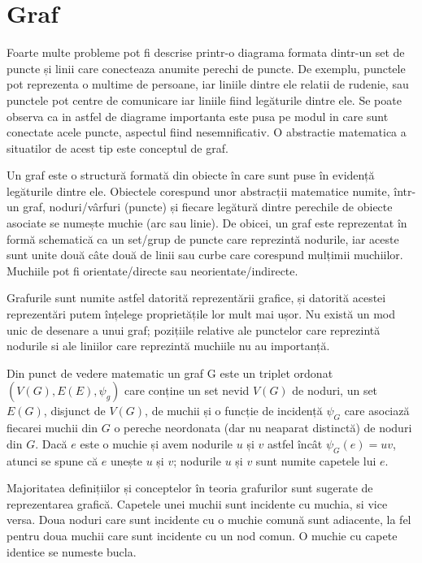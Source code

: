 \newpage
\section{Graf}

Foarte multe probleme pot fi descrise printr-o diagrama formata dintr-un set de puncte și linii care conecteaza anumite perechi de puncte.
De exemplu, punctele pot reprezenta o multime de persoane, iar liniile dintre ele relatii de rudenie, sau punctele pot centre de comunicare 
iar liniile fiind legăturile dintre ele. Se poate observa ca in astfel de diagrame importanta este pusa pe modul in care sunt conectate acele puncte,
aspectul fiind nesemnificativ. O abstractie matematica a situatilor de acest tip este conceptul de graf.\newline

Un graf este o structură formată din obiecte în care sunt puse în evidență legăturile dintre ele. 
Obiectele corespund unor abstracții matematice numite, într-un graf, noduri/vârfuri (puncte) și fiecare legătură 
dintre perechile de obiecte asociate se numește muchie (arc sau linie). 
De obicei, un graf este reprezentat în formă schematică ca un set/grup de puncte care reprezintă nodurile, iar aceste sunt unite două 
câte două de linii sau curbe care corespund mulțimii muchiilor. Muchiile pot fi orientate/directe sau neorientate/indirecte.\newline

Grafurile sunt numite astfel datorită reprezentării grafice, și datorită acestei reprezentări putem înțelege proprietățile lor mult mai ușor.
Nu există un mod unic de desenare a unui graf; pozițiile relative ale punctelor care reprezintă nodurile si ale liniilor care reprezintă muchiile nu au importanță.\newline


Din punct de vedere matematic un graf G este un triplet ordonat \((V(G),E(E),\psi_g)\) care conține un set nevid \(V(G)\) de noduri, un set \(E(G)\),
disjunct de \(V(G)\), de muchii și o funcție de incidență \(\psi_G\) care asociază fiecarei muchii din \(G\) o pereche neordonata (dar nu neaparat distinctă)
de noduri din \(G\). Dacă \(e\) este o muchie și avem nodurile \(u\) și \(v\) astfel încât \(\psi_G(e)=uv\), atunci se spune că \(e\) unește \(u\) și \(v\); 
nodurile \(u\) și \(v\) sunt numite capetele lui \(e\).\newline

Majoritatea definițiilor și conceptelor în teoria grafurilor sunt sugerate de reprezentarea grafică. Capetele unei muchii sunt incidente cu muchia, si vice versa. 
Doua noduri care sunt incidente cu o muchie comună sunt adiacente, la fel pentru doua muchii care sunt incidente cu un nod comun. O muchie cu capete identice se numeste bucla.\newline

